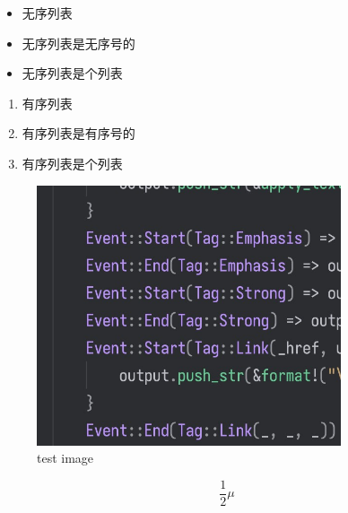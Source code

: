 \begin{itemize}
\item 无序列表
\item 无序列表是无序号的
\item 无序列表是个列表
\end{itemize}
\begin{enumerate}
\item 有序列表
\item 有序列表是有序号的
\item 有序列表是个列表
\end{enumerate}
\begin{figure}[h]
\centering
\includegraphics[width=0.8\textwidth]{images/test.jpg}
\caption{test image}
\label{fig:images/test.jpg}
\end{figure}


\begin{equation}
\frac{1}{2}\mu
\end{equation}

